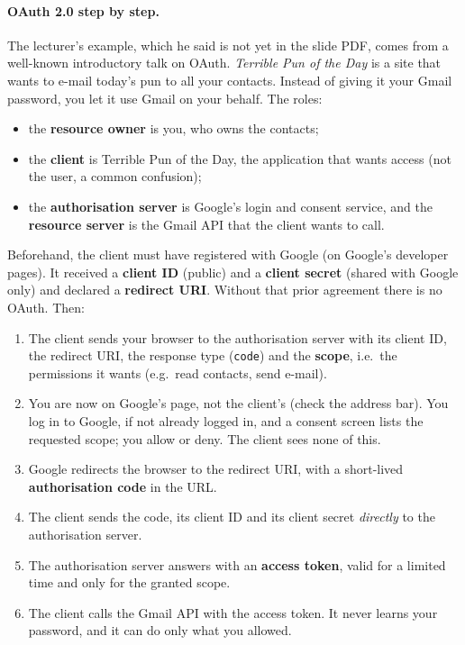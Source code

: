 \paragraph{OAuth 2.0 step by step.} The lecturer's example, which he said is not yet in the slide PDF, comes from a well-known introductory talk on OAuth. \emph{Terrible Pun of the Day} is a site that wants to e-mail today's pun to all your contacts. Instead of giving it your Gmail password, you let it use Gmail on your behalf. The roles:
\begin{itemize}
    \item the \textbf{resource owner} is you, who owns the contacts;
    \item the \textbf{client} is Terrible Pun of the Day, the application that wants access (not the user, a common confusion);
    \item the \textbf{authorisation server} is Google's login and consent service, and the \textbf{resource server} is the Gmail API that the client wants to call.
\end{itemize}
Beforehand, the client must have registered with Google (on Google's developer pages). It received a \textbf{client ID} (public) and a \textbf{client secret} (shared with Google only) and declared a \textbf{redirect URI}. Without that prior agreement there is no OAuth. Then:
\begin{enumerate}
    \item The client sends your browser to the authorisation server with its client ID, the redirect URI, the response type (\texttt{code}) and the \textbf{scope}, i.e.\ the permissions it wants (e.g.\ read contacts, send e-mail).
    \item You are now on Google's page, not the client's (check the address bar). You log in to Google, if not already logged in, and a consent screen lists the requested scope; you allow or deny. The client sees none of this.
    \item Google redirects the browser to the redirect URI, with a short-lived \textbf{authorisation code} in the URL.
    \item The client sends the code, its client ID and its client secret \emph{directly} to the authorisation server.
    \item The authorisation server answers with an \textbf{access token}, valid for a limited time and only for the granted scope.
    \item The client calls the Gmail API with the access token. It never learns your password, and it can do only what you allowed.
\end{enumerate}

